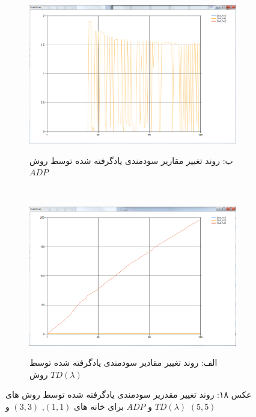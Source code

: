 \documentclass[10pt,a4paper]{article}
\begin{document}
\begin{figure}[h]
        \centering
        \begin{subfigure}[b]{0.5\textwidth}
            \includegraphics[width=\textwidth]{rlambda-adp}
            \begin{center}
                \textarabic{ب: روند تغییر مقاریر سودمندی یادگرفته شده توسط روش $ADP$ }
            \end{center}
        \end{subfigure}%
        ~ %
        \begin{subfigure}[b]{0.5\textwidth}
           \includegraphics[width=\textwidth]{rlambda-td}
            \begin{center}
                \textarabic{الف: روند تغییر مقادیر سودمندی یادگرفته شده توسط روش $TD(\lambda)$ }
            \end{center}
        \end{subfigure}
    \begin{center}
    \textarabic{عکس ۱۸: روند تغییر مقدریر سودمندی یادگرفته شده توسط روش های
     $TD(\lambda)$ و $ADP$
      برای خانه های 
      $(1, 1)$, $(3,3)$ 
     و
      $(5, 5)$
     }
    \end{center}
\end{figure}
\end{document}

